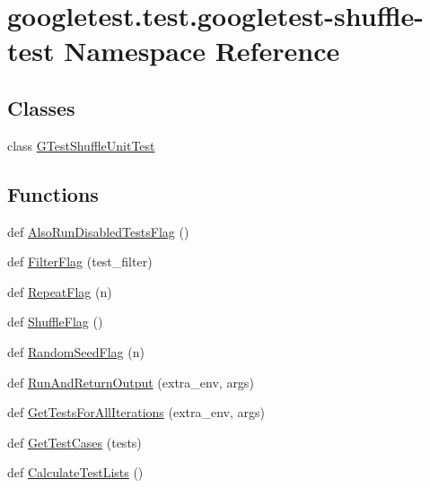 \hypertarget{namespacegoogletest_1_1test_1_1googletest-shuffle-test}{}\section{googletest.\+test.\+googletest-\/shuffle-\/test Namespace Reference}
\label{namespacegoogletest_1_1test_1_1googletest-shuffle-test}
\subsection*{Classes}
\begin{DoxyCompactItemize}
\item 
class \mbox{\hyperlink{classgoogletest_1_1test_1_1googletest-shuffle-test_1_1_g_test_shuffle_unit_test}{G\+Test\+Shuffle\+Unit\+Test}}
\end{DoxyCompactItemize}
\subsection*{Functions}
\begin{DoxyCompactItemize}
\item 
def \mbox{\hyperlink{namespacegoogletest_1_1test_1_1googletest-shuffle-test_a73fb59e0874bd06e935f7dae5f3a143f}{Also\+Run\+Disabled\+Tests\+Flag}} ()
\item 
def \mbox{\hyperlink{namespacegoogletest_1_1test_1_1googletest-shuffle-test_a244d0da1ad0a42553d1153f4978391c6}{Filter\+Flag}} (test\+\_\+filter)
\item 
def \mbox{\hyperlink{namespacegoogletest_1_1test_1_1googletest-shuffle-test_a42253bced1b3a534fe13c6a90585a21e}{Repeat\+Flag}} (n)
\item 
def \mbox{\hyperlink{namespacegoogletest_1_1test_1_1googletest-shuffle-test_a19a50de0ca6a1f7f5456689b2b90223d}{Shuffle\+Flag}} ()
\item 
def \mbox{\hyperlink{namespacegoogletest_1_1test_1_1googletest-shuffle-test_aa8b02fd804af8066de866aedd758c5a4}{Random\+Seed\+Flag}} (n)
\item 
def \mbox{\hyperlink{namespacegoogletest_1_1test_1_1googletest-shuffle-test_aa7955f69809be00aa29ee9ace1f5c99f}{Run\+And\+Return\+Output}} (extra\+\_\+env, args)
\item 
def \mbox{\hyperlink{namespacegoogletest_1_1test_1_1googletest-shuffle-test_afa42885313ae30eb06df1caec30186d9}{Get\+Tests\+For\+All\+Iterations}} (extra\+\_\+env, args)
\item 
def \mbox{\hyperlink{namespacegoogletest_1_1test_1_1googletest-shuffle-test_af1bfd12ecdd2727073cb53a3709cc448}{Get\+Test\+Cases}} (tests)
\item 
def \mbox{\hyperlink{namespacegoogletest_1_1test_1_1googletest-shuffle-test_aec84d8690d7bdc6863c19e91a4595a4f}{Calculate\+Test\+Lists}} ()
\end{DoxyCompactItemize}
